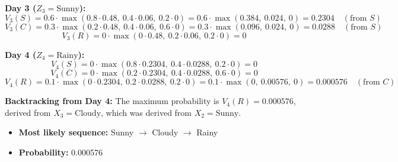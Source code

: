 \documentclass{article}
\begin{document}
\begin{enumerate}
    \textbf{Day 3 ($Z_3 = \text{Sunny}$):}
    $$ V_3(S) = 0.6 \cdot \max(0.8 \cdot 0.48,\ 0.4 \cdot 0.06,\ 0.2 \cdot 0) = 0.6 \cdot \max(0.384,\ 0.024,\ 0) = 0.2304 \quad (\text{from } S) $$
    $$ V_3(C) = 0.3 \cdot \max(0.2 \cdot 0.48,\ 0.4 \cdot 0.06,\ 0.6 \cdot 0) = 0.3 \cdot \max(0.096,\ 0.024,\ 0) = 0.0288 \quad (\text{from } S) $$
    $$ V_3(R) = 0 \cdot \max(0 \cdot 0.48,\ 0.2 \cdot 0.06,\ 0.2 \cdot 0) = 0 $$

    \textbf{Day 4 ($Z_4 = \text{Rainy}$):}
    $$ V_4(S) = 0 \cdot \max(0.8 \cdot 0.2304,\ 0.4 \cdot 0.0288,\ 0.2 \cdot 0) = 0 $$
    $$ V_4(C) = 0 \cdot \max(0.2 \cdot 0.2304,\ 0.4 \cdot 0.0288,\ 0.6 \cdot 0) = 0 $$
    $$ V_4(R) = 0.1 \cdot \max(0 \cdot 0.2304,\ 0.2 \cdot 0.0288,\ 0.2 \cdot 0) = 0.1 \cdot \max(0,\ 0.00576,\ 0) = 0.000576 \quad (\text{from } C) $$

    \textbf{Backtracking from Day 4:}
    The maximum probability is $V_4(R) = 0.000576$, derived from $X_3 = \text{Cloudy}$, which was derived from $X_2 = \text{Sunny}$.

    \begin{itemize}
        \item \textbf{Most likely sequence:} Sunny $\rightarrow$ Cloudy $\rightarrow$ Rainy
        \item \textbf{Probability:} 0.000576
    \end{itemize}

\end{enumerate}
\end{document}
